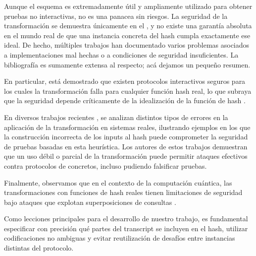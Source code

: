 Aunque el esquema \FiatShamir es extremadamente útil y ampliamente utilizado para obtener pruebas no interactivas, no es una panacea sin riesgos. La seguridad de la transformación se demuestra únicamente en el \ROM, y no existe una garantía absoluta en el mundo real de que una instancia concreta del hash cumpla exactamente ese ideal. De hecho, múltiples trabajos han documentado varios problemas asociados a implementaciones mal hechas o a condiciones de seguridad insuficientes. La bibliografía es sumamente extensa al respecto; acá dejamos un pequeño resumen.

En particular, está demostrado que existen protocolos interactivos seguros para los cuales la transformación \FiatShamir falla para cualquier función hash real, lo que subraya que la seguridad depende críticamente de la idealización de la función de hash \cite{Goldwasser}.

En diversos trabajos recientes \cite{Dao2023, cryptoeprint:2024/1565, Khovratovich2025}, se analizan distintos tipos de errores en la aplicación de la transformación en sistemas reales, ilustrando ejemplos en los que la construcción incorrecta de los inputs al hash puede comprometer la seguridad de pruebas basadas en esta heurística. Los autores de estos trabajos demuestran que un uso débil o parcial de la transformación puede permitir ataques efectivos contra protocolos de \SNARK concretos, incluso pudiendo falsificar pruebas.

Finalmente, observamos que en el contexto de la computación cuántica, las transformaciones \FiatShamir con funciones de hash reales tienen limitaciones de seguridad bajo ataques que explotan superposiciones de consultas \cite{cryptoeprint:2024/590}.

Como lecciones principales para el desarrollo de nuestro trabajo, es fundamental especificar con precisión qué partes del transcript se incluyen en el hash, utilizar codificaciones no ambiguas y evitar reutilización de desafíos entre instancias distintas del protocolo.
